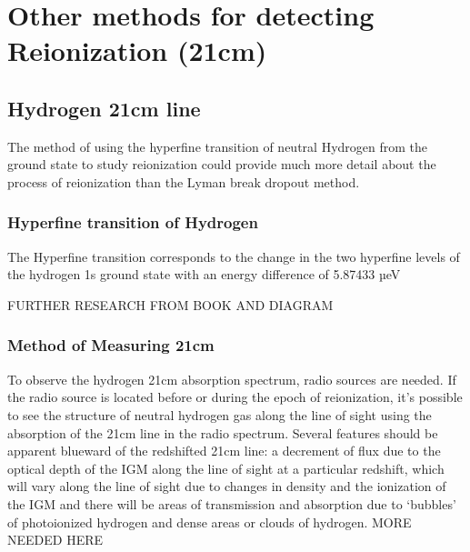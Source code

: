 
\section{Other methods for detecting Reionization (21cm)} %
\label{sec:other_methods21cm}

    \subsection{Hydrogen 21cm line} %
    \label{sub:Hydrogen_21cm}

The method of using the hyperfine transition of neutral Hydrogen from the ground state to study reionization could provide much more detail about the process of reionization than the Lyman break dropout method.

         \subsubsection{Hyperfine transition of Hydrogen} %
         \label{subsub:Hyperfine_Hydrogen}

The Hyperfine transition corresponds to the change in the two hyperfine levels of the hydrogen 1s ground state with an energy difference of 5.87433 µeV

FURTHER RESEARCH FROM BOOK AND DIAGRAM
    
	
         \subsubsection{Method of Measuring 21cm} %
	\label{subsub:Measuring_21cm} 

To observe the hydrogen 21cm absorption spectrum, radio sources are needed. If the radio source is located before or during the epoch of reionization, it’s possible to see the structure of neutral hydrogen gas along the line of sight using the absorption of the 21cm line in the radio spectrum. Several features should be apparent blueward of the redshifted 21cm line: a decrement of flux due to the optical depth of the IGM along the line of sight at a particular redshift, which will vary along the line of sight due to changes in density and the ionization of the IGM and there will be areas of transmission and absorption due to ‘bubbles’ of photoionized hydrogen and dense areas or clouds of hydrogen.  MORE NEEDED HERE

